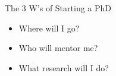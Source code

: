 \begin{frame}[fragile]{The 3 W's of Starting a PhD}

\begin{itemize}
    \item \textcolor{green!60!black}{Where} will I go?
    \item \textcolor{blue!60}{Who} will mentor me?
    \item \textcolor{red!60}{What} research will I do?
\end{itemize}

\end{frame}

